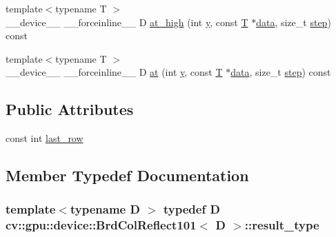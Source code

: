 \begin{DoxyCompactItemize}
{\footnotesize template$<$typename T $>$ }\\\-\_\-\-\_\-device\-\_\-\-\_\- \-\_\-\-\_\-forceinline\-\_\-\-\_\- D \hyperlink{structcv_1_1gpu_1_1device_1_1BrdColReflect101_a27925dce94b3b79ea80da08e72c97a10}{at\-\_\-high} (int \hyperlink{highgui__c_8h_af1202c02b14870c18fb3a1da73e9e7c7}{y}, const \hyperlink{calib3d_8hpp_a3efb9551a871ddd0463079a808916717}{T} $\ast$\hyperlink{legacy_8hpp_ab9fe6c09e6d02865a953fffc12fe6ca0}{data}, size\-\_\-t \hyperlink{legacy_8hpp_abc16e65f240ed0c8f3e876e8732c0a33}{step}) const 
\item 
{\footnotesize template$<$typename T $>$ }\\\-\_\-\-\_\-device\-\_\-\-\_\- \-\_\-\-\_\-forceinline\-\_\-\-\_\- D \hyperlink{structcv_1_1gpu_1_1device_1_1BrdColReflect101_a4bbf97f04dec010494b734b925bad996}{at} (int \hyperlink{highgui__c_8h_af1202c02b14870c18fb3a1da73e9e7c7}{y}, const \hyperlink{calib3d_8hpp_a3efb9551a871ddd0463079a808916717}{T} $\ast$\hyperlink{legacy_8hpp_ab9fe6c09e6d02865a953fffc12fe6ca0}{data}, size\-\_\-t \hyperlink{legacy_8hpp_abc16e65f240ed0c8f3e876e8732c0a33}{step}) const 
\end{DoxyCompactItemize}
\subsection*{Public Attributes}
\begin{DoxyCompactItemize}
\item 
const int \hyperlink{structcv_1_1gpu_1_1device_1_1BrdColReflect101_a1a0c12421697d92d8fa5c0f16bc64457}{last\-\_\-row}
\end{DoxyCompactItemize}


\subsection{Member Typedef Documentation}
\hypertarget{structcv_1_1gpu_1_1device_1_1BrdColReflect101_a025ccbde06463c89254318cbb6942d80}{
\subsubsection[{result\-\_\-type}]{\setlength{\rightskip}{0pt plus 5cm}template$<$typename D $>$ typedef D {\bf cv\-::gpu\-::device\-::\-Brd\-Col\-Reflect101}$<$ D $>$\-::{\bf result\-\_\-type}}}\label{structcv_1_1gpu_1_1device_1_1BrdColReflect101_a025ccbde06463c89254318cbb6942d80}


